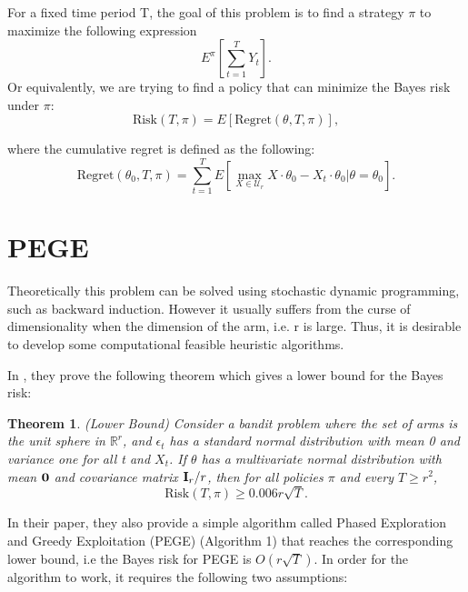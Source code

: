 \documentclass{article}
\newtheorem{theorem}{Theorem}
\theoremstyle{plain}
\theoremstyle{definition}
\begin{document}
For a fixed time period T, the goal of this problem is to find a strategy $\pi$ to maximize the following expression
\begin{equation}
E^{\pi}\left[\sum_{t=1}^{T} Y_{t}\right].
\end{equation}
Or equivalently, we are trying to find a policy that can minimize the Bayes risk under $\pi$:
\begin{equation}
\text{Risk}(T,\pi) = E\left[\text{Regret}(\theta,T,\pi)\right],
\end{equation}

where the cumulative regret is defined as the following:
\begin{equation}
\text{Regret}(\theta_{0},T,\pi)=\sum_{t=1}^{T}E\left[\max_{X\in \mathcal{U}_{r}}X\cdot\theta_{0}-X_{t}\cdot \theta_{0}|\theta=\theta_{0}\right].
\end{equation}





\section{PEGE}

Theoretically this problem can be solved using stochastic dynamic programming, such as backward induction. However it usually suffers from the curse of dimensionality when the dimension of the arm, i.e. r is large. Thus, it is desirable to develop some computational feasible heuristic algorithms.

In \citet{Paat}, they prove the following theorem which gives a lower bound for the Bayes risk:

\begin{theorem}(Lower Bound)
Consider a bandit problem where the set of arms is the unit sphere in $\mathbb{R}^{r}$, and $\epsilon_{t}$ has a standard normal distribution with mean 0 and variance one for all t and $X_{t}$. If $\theta$ has a multivariate normal distribution with mean $\bold{0}$ and covariance matrix $\bold{I}_{r}/r$, then for all policies $\pi$ and every $T\geq r^{2}$,
\begin{equation}
\text{Risk}(T,\pi)\geq 0.006r\sqrt{T}. \nonumber 
\end{equation}
\end{theorem}

In their paper, they also provide a simple algorithm called Phased Exploration and Greedy Exploitation (PEGE) (Algorithm 1) that reaches the corresponding lower bound, i.e the Bayes risk for PEGE is $O(r\sqrt{T})$. In order for the algorithm to work, it requires the following two assumptions:
\end{document}
